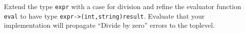 Extend the type \lstinline{expr} with a case for division and refine
the evaluator function \lstinline{eval} to have
type \lstinline{expr->(int,string)result}.  Evaluate that your
implementation will propagate ``Divide by zero'' errors to the
toplevel.
